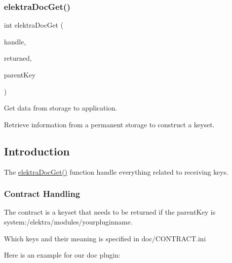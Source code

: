 \subsubsection{\texorpdfstring{elektra\+Doc\+Get()}{elektraDocGet()}}
{\footnotesize\ttfamily int elektra\+Doc\+Get (\begin{DoxyParamCaption}\item[{Plugin $\ast$}]{handle,  }\item[{Key\+Set $\ast$}]{returned,  }\item[{Key $\ast$}]{parent\+Key }\end{DoxyParamCaption})}



Get data from storage to application. 

Retrieve information from a permanent storage to construct a keyset.\hypertarget{group__plugin_intro}{}\subsection{Introduction}\label{group__plugin_intro}
The \hyperlink{group__plugin_gacb69f3441c6d84241b4362f958fbe313}{elektra\+Doc\+Get()} function handle everything related to receiving keys.\hypertarget{group__plugin_contract}{}\subsubsection{Contract Handling}\label{group__plugin_contract}
The contract is a keyset that needs to be returned if the parent\+Key is system\+:/elektra/modules/yourpluginname.

Which keys and their meaning is specified in doc/\+C\+O\+N\+T\+R\+A\+C\+T.\+ini

Here is an example for our doc plugin\+:


